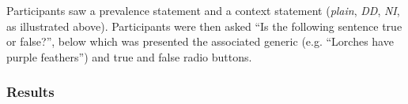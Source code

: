 \documentclass[10pt,letterpaper]{article}
\begin{document}
Participants saw a prevalence statement and a context statement (\emph{plain}, \emph{DD}, \emph{NI}, as illustrated above). 
Participants were then asked ``Is the following sentence true or false?'', below which was presented the associated generic (e.g. ``Lorches have purple feathers'') and true and false radio buttons. 

\subsubsection{Results}
\end{document}
